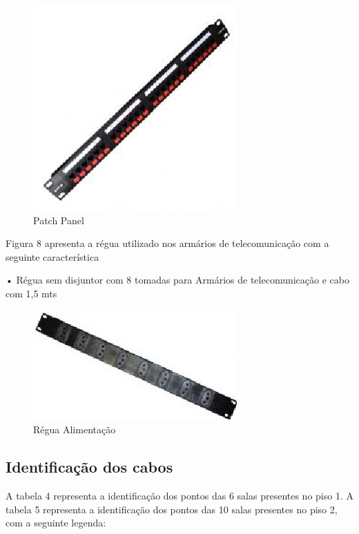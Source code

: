 \documentclass[	DIV=calc,%
							paper=a4,%
							fontsize=12pt,%
							onecolumn]{scrartcl}	 					%
\begin{document}
\begin{figure}
	\centering
	\includegraphics[width=0.7\linewidth]{pathcpanel}
	\caption{Patch Panel }
	\label{fig:pathcpanel}
\end{figure}

Figura 8 apresenta a régua utilizado nos armários de telecomunicação com a seguinte
característica 

• Régua sem disjuntor com 8 tomadas para Armários de telecomunicação e cabo com 1,5 mts


\begin{figure}
	\centering
	\includegraphics[width=0.7\linewidth]{reguaene}
	\caption{Régua Alimentação}
	\label{fig:reguaene}
\end{figure}

\subsection{Identificação dos cabos}
A tabela 4 representa a identificação dos pontos das 6 salas presentes no piso 1. A tabela
5 representa a identificação dos pontos das 10 salas presentes no piso 2, com a seguinte
legenda:
\end{document}
